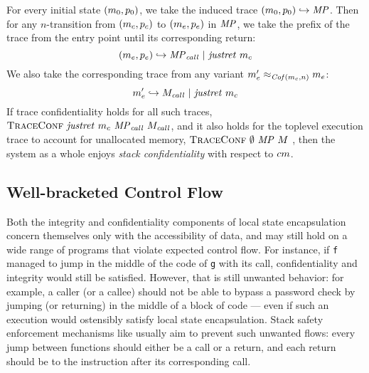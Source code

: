 \documentclass[acmsmall,review,anonymous]{acmart}\settopmatter{printfolios=true,printccs=false,printacmref=false}
\begin{document}
{%
For every initial state \((m_0,p_0)\), we take the induced trace
\((m_0,p_0) \hookrightarrow \mathit{MP}\). Then for
any \(n\)-transition from $(m_c,p_c)$ to
$(m_e,p_e)$ in $\mathit{MP}$, we take the prefix of the trace
from the entry point until its corresponding return:
%
\[(m_e,p_e) \hookrightarrow \mathit{MP}_{\mathit{call}} ~ | ~ \mathit{justret}\ m_c\]
%
We also take the corresponding trace from any variant \(m_e'
\approx_{\mathit{Cof}(m_c,n)} m_e\):
%
\[m_e' \hookrightarrow M_{\mathit{call}} ~ | ~ \mathit{justret}\ m_c\]
%
%
If trace confidentiality holds for all such traces,
\(\text{\sc TraceConf} ~ \mathit{justret}\ m_c ~ \mathit{MP}_{\mathit{call}} ~
M_{\mathit{call}}\), and it also holds for the toplevel execution
trace to account for unallocated memory, \(\text{\sc TraceConf} ~
\emptyset ~ \mathit{MP} ~ M\) , then the system as a whole enjoys {\em
  stack confidentiality} with respect to \(cm\).

\subsection{Well-bracketed Control Flow}
\label{sec:wbcf}

Both the integrity and confidentiality components of local state
encapsulation concern themselves only with the accessibility of data,
and may still hold on a wide range of programs that violate expected
control flow. For instance, if {\tt f} managed to jump in the middle of
the code of {\tt g} with its call, confidentiality and integrity would
still be satisfied.
%
However, that is still unwanted behavior: for example, a caller (or a
callee) should not be able to bypass a password check by jumping (or
returning) in the middle of a block of code --- even if such an execution
would ostensibly satisfy local state encapsulation.
%
Stack safety enforcement mechanisms like \citet{Skorstengaard+19}
usually aim to prevent such unwanted flows: every jump between
functions should either be a call or a return, and each return should
be to the instruction after its corresponding call.

}
\end{document}

